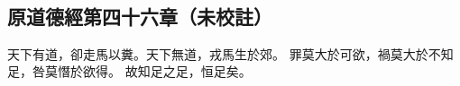 ﻿%
%

\chapter{~}

\section{原道德經第四十六章（未校註）}

\begin{withgezhu}

\zhsong


天下有道，卻走馬以糞。天下無道，戎馬生於郊。
罪莫大於可欲，禍莫大於不知足，\textcolor{tongjia-color}{咎莫憯於欲得}。
故知足之足，恒足矣。

\end{withgezhu}
